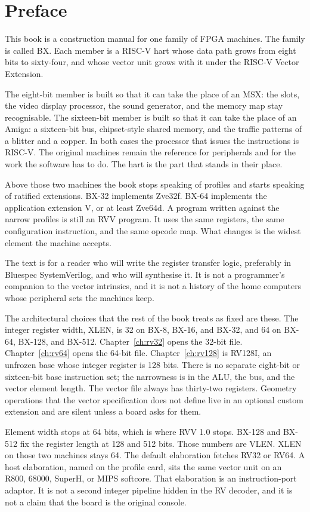 \chapter{Preface}

This book is a construction manual for one family of FPGA machines. The family is called BX. Each member is a RISC-V hart whose data path grows from eight bits to sixty-four, and whose vector unit grows with it under the RISC-V Vector Extension.

The eight-bit member is built so that it can take the place of an MSX: the slots, the video display processor, the sound generator, and the memory map stay recognisable. The sixteen-bit member is built so that it can take the place of an Amiga: a sixteen-bit bus, chipset-style shared memory, and the traffic patterns of a blitter and a copper. In both cases the processor that issues the instructions is RISC-V. The original machines remain the reference for peripherals and for the work the software has to do. The hart is the part that stands in their place.

Above those two machines the book stops speaking of profiles and starts speaking of ratified extensions. BX-32 implements Zve32f. BX-64 implements the application extension V, or at least Zve64d. A program written against the narrow profiles is still an RVV program. It uses the same registers, the same configuration instruction, and the same opcode map. What changes is the widest element the machine accepts.

The text is for a reader who will write the register transfer logic, preferably in Bluespec SystemVerilog, and who will synthesise it. It is not a programmer's companion to the vector intrinsics, and it is not a history of the home computers whose peripheral sets the machines keep.

The architectural choices that the rest of the book treats as fixed are these. The integer register width, XLEN, is 32 on BX-8, BX-16, and BX-32, and 64 on BX-64, BX-128, and BX-512. Chapter~\ref{ch:rv32} opens the 32-bit file. Chapter~\ref{ch:rv64} opens the 64-bit file. Chapter~\ref{ch:rv128} is RV128I, an unfrozen base whose integer register is 128 bits. There is no separate eight-bit or sixteen-bit base instruction set; the narrowness is in the ALU, the bus, and the vector element length. The vector file always has thirty-two registers. Geometry operations that the vector specification does not define live in an optional custom extension and are silent unless a board asks for them.

Element width stops at 64 bits, which is where RVV 1.0 stops. BX-128 and BX-512 fix the register length at 128 and 512 bits. Those numbers are VLEN. XLEN on those two machines stays 64. The default elaboration fetches RV32 or RV64. A host elaboration, named on the profile card, sits the same vector unit on an R800, 68000, SuperH, or MIPS softcore. That elaboration is an instruction-port adaptor. It is not a second integer pipeline hidden in the RV decoder, and it is not a claim that the board is the original console.
